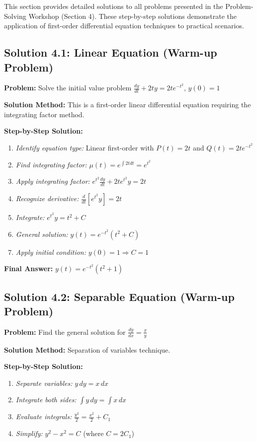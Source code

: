 \documentclass[12pt, letterpaper]{book}
\theoremstyle{problemstyle}
\theoremstyle{solutionstyle}
\begin{document}
This section provides detailed solutions to all problems presented in the Problem-Solving Workshop (Section 4). These step-by-step solutions demonstrate the application of first-order differential equation techniques to practical scenarios.

\subsection{Solution 4.1: Linear Equation (Warm-up Problem)}

\textbf{Problem:} Solve the initial value problem $\frac{dy}{dt} + 2ty = 2te^{-t^2}$, $y(0) = 1$

\textbf{Solution Method:} This is a first-order linear differential equation requiring the integrating factor method.

\textbf{Step-by-Step Solution:}
\begin{enumerate}
    \item \textit{Identify equation type:} Linear first-order with $P(t) = 2t$ and $Q(t) = 2te^{-t^2}$
    \item \textit{Find integrating factor:} $\mu(t) = e^{\int 2t dt} = e^{t^2}$
    \item \textit{Apply integrating factor:} $e^{t^2}\frac{dy}{dt} + 2te^{t^2}y = 2t$
    \item \textit{Recognize derivative:} $\frac{d}{dt}[e^{t^2}y] = 2t$
    \item \textit{Integrate:} $e^{t^2}y = t^2 + C$
    \item \textit{General solution:} $y(t) = e^{-t^2}(t^2 + C)$
    \item \textit{Apply initial condition:} $y(0) = 1 \Rightarrow C = 1$
\end{enumerate}

\textbf{Final Answer:} $y(t) = e^{-t^2}(t^2 + 1)$

\subsection{Solution 4.2: Separable Equation (Warm-up Problem)}

\textbf{Problem:} Find the general solution for $\frac{dy}{dx} = \frac{x}{y}$

\textbf{Solution Method:} Separation of variables technique.

\textbf{Step-by-Step Solution:}
\begin{enumerate}
    \item \textit{Separate variables:} $y \, dy = x \, dx$
    \item \textit{Integrate both sides:} $\int y \, dy = \int x \, dx$
    \item \textit{Evaluate integrals:} $\frac{y^2}{2} = \frac{x^2}{2} + C_1$
    \item \textit{Simplify:} $y^2 - x^2 = C$ (where $C = 2C_1$)
\end{enumerate}
\end{document}
